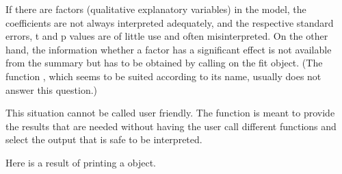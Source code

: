 \documentclass[11pt]{article}
\begin{document}
If there are factors (qualitative explanatory variables) in the model, 
the coefficients are not always interpreted adequately, and the 
respective standard errors, t and p values are of little use and often
misinterpreted. 
On the other hand, the information whether a factor has a significant
effect is not available from the summary but has to be obtained by calling 
 on the fit object. 
(The function , which seems to be suited according to its
name, usually does not answer this question.)

This situation cannot be called user friendly.
The function  is meant to provide the results that are needed
without having the user call different functions and select the 
output that is safe to be interpreted.

Here is a result of printing a  object.
\begin{Schunk}
\end{Schunk}
\end{document}
